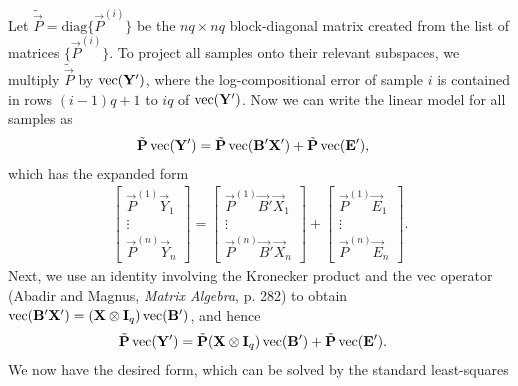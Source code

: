 Let $\tilde{\vec P} = \text{diag}\{\vec P^{(i)}\}$ be the $nq \times nq$
block-diagonal matrix created from the list of matrices $\{\vec P^{(i)}\}$.  To
project all samples onto their relevant subspaces, we multiply $\tilde{\vec
  P}$ by $\operatorname{vec}(\mathbf{Y}')$, where the log-compositional error of sample $i$ is
contained in rows $(i-1)q + 1$ to $iq$ of $\operatorname{vec}(\mathbf{Y}')$.
Now we can write the linear model for all samples as
\begin{align} 
  \tilde{\mathbf{P}} \operatorname{vec}(\mathbf{Y}') 
    &= \tilde{\mathbf{P}} \operatorname{vec}(\mathbf{B}' \mathbf{X}') + \tilde{\mathbf{P}} \operatorname{vec}(\mathbf{E}'),
\end{align}
which has the expanded form
\begin{align*} 
  \begin{bmatrix}
    \vec P^{(1)} \vec Y_1\\
    \vdots \\
    \vec P^{(n)} \vec Y_n
  \end{bmatrix}
  = 
  \begin{bmatrix}
    \vec P^{(1)} \vec B' \vec X_1\\
    \vdots \\
    \vec P^{(n)} \vec B' \vec X_n
  \end{bmatrix}
  +
  \begin{bmatrix}
    \vec P^{(1)} \vec E_1\\
    \vdots \\
    \vec P^{(n)} \vec E_n
  \end{bmatrix}.
\end{align*}
Next, we use an identity involving the Kronecker product and the vec operator
(Abadir and Magnus, \emph{Matrix Algebra}, p. 282) to obtain $\operatorname{vec}(\mathbf{B}'
\mathbf{X}') = (\mathbf{X} \otimes \mathbf{I}_q) \operatorname{vec}(\mathbf{B}')$, and hence
\begin{align} 
  \label{}
  \tilde{\mathbf{P}} \operatorname{vec}(\mathbf{Y}') 
  &= \tilde{\mathbf{P}} (\mathbf{X} \otimes \mathbf{I}_q) \operatorname{vec}(\mathbf{B}')
    + \tilde{\mathbf{P}} \operatorname{vec}(\mathbf{E}').
\end{align}
We now have the desired form, which can be solved by the standard least-squares
